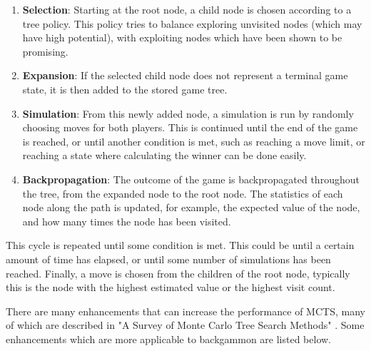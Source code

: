 \begin{enumerate}
    \item \textbf{Selection}: Starting at the root node, a child node is chosen according to a tree policy. This policy tries to balance exploring unvisited nodes (which may have high potential), with exploiting nodes which have been shown to be promising.
    \item \textbf{Expansion}: If the selected child node does not represent a terminal game state, it is then added to the stored game tree. 
    \item \textbf{Simulation}: From this newly added node, a simulation is run by randomly choosing moves for both players. This is continued until the end of the game is reached, or until another condition is met, such as reaching a move limit, or reaching a state where calculating the winner can be done easily.
    \item \textbf{Backpropagation}: The outcome of the game is backpropagated throughout the tree, from the expanded node to the root node. The statistics of each node along the path is updated, for example, the expected value of the node, and how many times the node has been visited. 
\end{enumerate}

This cycle is repeated until some condition is met. This could be until a certain amount of time has elapsed, or until some number of simulations has been reached. Finally, a move is chosen from the children of the root node, typically this is the node with the highest estimated value or the highest visit count.

There are many enhancements that can increase the performance of MCTS, many of which are described in "A Survey of Monte Carlo Tree Search Methods" \cite{Browne2012}. Some enhancements which are more applicable to backgammon are listed below.

